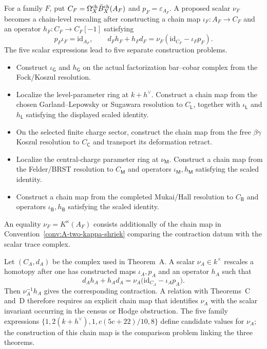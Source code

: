 \begin{remark}
\label{rem:A-h-three-paths}
%
For a family $F$, put
$C_F=\Omega^{\mathrm{ch}}_X\bar{B}^{\mathrm{ch}}_X(A_F)$ and $p_F=\varepsilon_{A_F}$.  A proposed
scalar $\nu_F$ becomes a chain-level rescaling after constructing a
chain map $\iota_F\colon A_F\to C_F$ and an operator
$h_F\colon C_F\to C_F[-1]$ satisfying
\[
p_F\iota_F=\mathrm{id}_{A_F},
\qquad
d_Fh_F+h_Fd_F
=\nu_F(\mathrm{id}_{C_F}-\iota_Fp_F).
\]
The five scalar expressions lead to five separate construction
problems.
\begin{itemize}
\item[$\mathsf G$: $\nu_{\mathsf G}=1$.]
Construct $\iota_{\mathsf G}$ and $h_{\mathsf G}$ on the actual
factorization bar--cobar complex from the Fock/Koszul resolution.
\item[$\mathsf L$: $\nu_{\mathsf L}=2(k+h^\vee)$.]
Localize the level-parameter ring at $k+h^\vee$.  Construct a chain
map from the chosen Garland--Lepowsky or Sugawara resolution to
$C_{\mathsf L}$, together with $\iota_{\mathsf L}$ and
$h_{\mathsf L}$ satisfying the displayed scaled identity.
\item[$\mathsf C$: $\nu_{\mathsf C}=1$.]
On the selected finite charge sector, construct the chain map from the
free $\beta\gamma$ Koszul resolution to $C_{\mathsf C}$ and transport
its deformation retract.
\item[$\mathsf M$: $\nu_{\mathsf M}=c(5c+22)/10$.]
Localize the central-charge parameter ring at $\nu_{\mathsf M}$.
Construct a chain map from the Felder/BRST resolution to
$C_{\mathsf M}$ and operators
$\iota_{\mathsf M},h_{\mathsf M}$ satisfying the scaled identity.
\item[$\mathsf B$: $\nu_{\mathsf B}=8$.]
Construct a chain map from the completed Mukai/Hall resolution to
$C_{\mathsf B}$ and operators $\iota_{\mathsf B},h_{\mathsf B}$
satisfying the scaled identity.
\end{itemize}
An equality $\nu_F=K^\kappa(A_F)$ consists additionally of the chain
map in Convention~\ref{conv:A-two-kappa-shriek} comparing the
contraction datum with the scalar trace complex.
\end{remark}

\begin{remark}
\label{rem:A-h-bridge}
%
Let $(C_A,d_A)$ be the complex used in Theorem~A.  A scalar
$\nu_A\in k^\times$ rescales a homotopy after one has constructed
maps $\iota_A,p_A$ and an operator $h_A$ such
that
\[
 d_Ah_A+h_Ad_A
 =\nu_A\bigl(\mathrm{id}_{C_A}-\iota_Ap_A\bigr).
\]
Then $\nu_A^{-1}h_A$ gives the corresponding
contraction.  A relation with Theorems~C and~D therefore requires an
explicit chain map that identifies $\nu_A$ with the scalar
invariant occurring in the census or Hodge obstruction.  The five
family expressions
$\{1,2(k+h^\vee),1,c(5c+22)/10,8\}$ define candidate values for
$\nu_A$; the
construction of this chain map is the comparison problem linking the
three theorems.
\end{remark}

